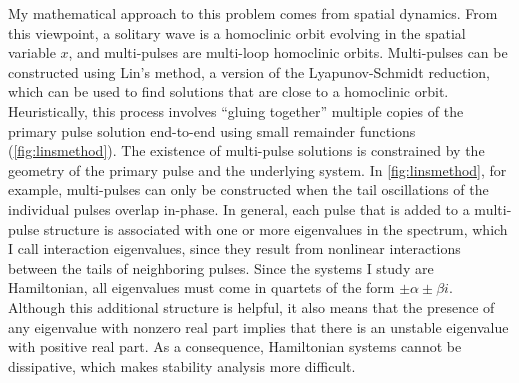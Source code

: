 \documentclass[11pt,reqno,oneside]{article}
\theoremstyle{definition}
\theoremstyle{remark}
\begin{document}
My mathematical approach to this problem comes from spatial dynamics. From this viewpoint, a solitary wave is a homoclinic orbit evolving in the spatial variable $x$, and multi-pulses are multi-loop homoclinic orbits. Multi-pulses can be constructed using Lin's method, a version of the Lyapunov-Schmidt reduction, which can be used to find solutions that are close to a homoclinic orbit. Heuristically, this process involves ``gluing together'' multiple copies of the primary pulse solution end-to-end using small remainder functions (\cref{fig:linsmethod}). The existence of multi-pulse solutions is constrained by the geometry of the primary pulse and the underlying system. In \cref{fig:linsmethod}, for example, multi-pulses can only be constructed  when the tail oscillations of the individual pulses overlap in-phase. In general, each pulse that is added to a multi-pulse structure is associated with one or more eigenvalues in the spectrum, which I call interaction eigenvalues, since they result from nonlinear interactions between the tails of neighboring pulses. Since the systems I study are Hamiltonian, all eigenvalues must come in quartets of the form $\pm \alpha \pm \beta i$. Although this additional structure is helpful, it also means that the presence of any eigenvalue with nonzero real part implies that there is an unstable eigenvalue with positive real part. As a consequence, Hamiltonian systems cannot be dissipative, which makes stability analysis more difficult. 
\end{document}
